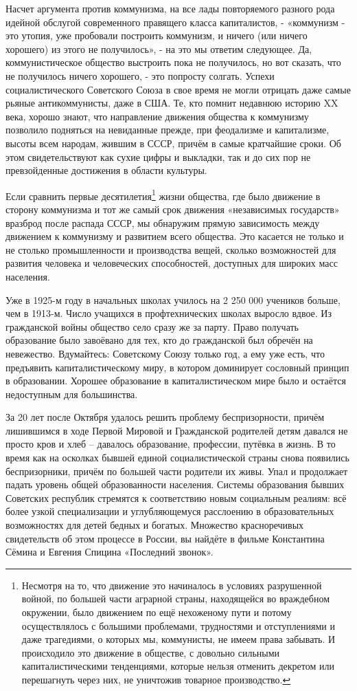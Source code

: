 \documentclass[12pt,a4paper,openany]{book}
\begin{document}
Насчет аргумента против коммунизма, на все лады повторяемого разного рода идейной обслугой современного правящего класса капиталистов, - «коммунизм - это утопия, уже пробовали построить коммунизм, и ничего (или ничего хорошего) из этого не получилось», - на это мы ответим следующее. Да, коммунистическое общество выстроить пока не получилось, но вот сказать, что не получилось ничего хорошего, - это попросту солгать. Успехи социалистического Советского Союза в свое время не могли отрицать даже самые рьяные антикоммунисты, даже в США. Те, кто помнит недавнюю историю XX века, хорошо знают, что направление движения общества к коммунизму позволило подняться на невиданные прежде, при феодализме и капитализме, высоты всем народам, жившим в СССР, причём в самые кратчайшие сроки. Об этом свидетельствуют как сухие цифры и выкладки, так и до сих пор не превзойденные достижения в области культуры.

Если сравнить первые десятилетия\footnote{Несмотря на то, что движение это начиналось в условиях разрушенной войной, по большей части аграрной страны, находящейся во враждебном окружении, было движением по ещё нехоженому пути и потому осуществлялось с большими проблемами, трудностями и отступлениями и даже трагедиями, о которых мы, коммунисты, не имеем права забывать. И происходило это движение в обществе, с довольно сильными капиталистическими тенденциями, которые нельзя отменить декретом или перешагнуть через них, не уничтожив товарное производство.} жизни общества, где было движение в сторону коммунизма и тот же самый срок движения «независимых государств» вразброд после распада СССР, мы обнаружим прямую зависимость между движением к коммунизму и развитием всего общества. Это касается не только и не столько промышленности и производства вещей, сколько возможностей для развития человека и человеческих способностей, доступных для широких масс населения.

Уже в 1925-м году в начальных школах училось на 2 250 000 учеников больше, чем в 1913-м. Число учащихся в профтехнических школах выросло вдвое. Из гражданской войны общество село сразу же за парту. Право получать образование было завоёвано для тех, кто до гражданской был обречён на невежество. Вдумайтесь: Советскому Союзу только год, а ему уже есть, что предъявить капиталистическому миру, в котором доминирует сословный принцип в образовании. Хорошее образование в капиталистическом мире было и остаётся недоступным для большинства.

За 20 лет после Октября удалось решить проблему беспризорности, причём лишившимся в ходе Первой Мировой и Гражданской родителей детям давался не просто кров и хлеб – давалось образование, профессии, путёвка в жизнь. В то время как на осколках бывшей единой социалистической страны снова появились беспризорники, причём по большей части родители их живы. Упал и продолжает падать уровень общей образованности населения. Системы образования бывших Советских республик стремятся к соответствию новым социальным реалиям: всё более узкой специализации и углубляющемуся расслоению в образовательных возможностях для детей бедных и богатых. Множество красноречивых свидетельств об этом процессе в России, вы найдёте в фильме Константина Сёмина и Евгения Спицина «Последний звонок».
\end{document}
